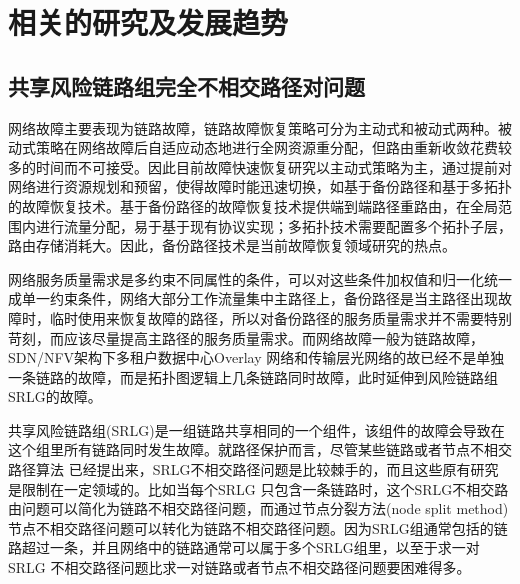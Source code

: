 \section{相关的研究及发展趋势}
\subsection{共享风险链路组完全不相交路径对问题}
网络故障主要表现为链路故障，链路故障恢复策略可分为主动式和被动式两种\cite{kvalbein2006fast,qi2012research}。被动式策略在网络故障后自适应动态地进行全网资源重分配，但路由重新收敛花费较多的时间而不可接受。因此目前故障快速恢复研究以主动式策略为主，通过提前对网络进行资源规划和预留，使得故障时能迅速切换，如基于备份路径和基于多拓扑\cite{shand2010ip}的故障恢复技术。基于备份路径的故障恢复技术提供端到端路径重路由，在全局范围内进行流量分配，易于基于现有协议实现；多拓扑技术需要配置多个拓扑子层，路由存储消耗大。因此，备份路径技术是当前故障恢复领域研究的热点\cite{yang2014keep,wang2010r3,banner2010designing,suchara2011network,zheng2014cross}。

网络服务质量需求是多约束不同属性的条件，可以对这些条件加权值和归一化统一成单一约束条件，网络大部分工作流量集中主路径上，备份路径是当主路径出现故障时，临时使用来恢复故障的路径，所以对备份路径的服务质量需求并不需要特别苛刻，而应该尽量提高主路径的服务质量需求。而网络故障一般为链路故障，SDN/NFV架构下多租户数据中心Overlay 网络和传输层光网络的故已经不是单独一条链路的故障，而是拓扑图逻辑上几条链路同时故障，此时延伸到风险链路组SRLG的故障。

共享风险链路组(SRLG)是一组链路共享相同的一个组件，该组件的故障会导致在这个组里所有链路同时发生故障。就路径保护而言，尽管某些链路或者节点不相交路径算法\cite{li1990complexity,guo2003link,xu2004finding,beshir2011variants,hu2003diverse} 已经提出来，SRLG不相交路径问题是比较棘手的，而且这些原有研究是限制在一定领域的。比如当每个SRLG 只包含一条链路时，这个SRLG不相交路由问题可以简化为链路不相交路径问题，而通过节点分裂方法(node split method)\cite{ford2015flows}节点不相交路径问题可以转化为链路不相交路径问题。因为SRLG组通常包括的链路超过一条，并且网络中的链路通常可以属于多个SRLG组里，以至于求一对SRLG 不相交路径问题比求一对链路或者节点不相交路径问题要困难得多。

